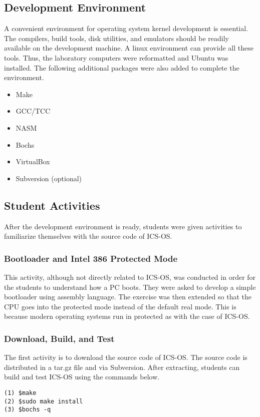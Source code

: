 \documentclass{acm_proc_article-sp}
\begin{document}
\subsection{Development Environment}
A convenient environment for operating system kernel development is essential.
The compilers, build tools, disk utilities, and emulators should be readily 
available on the development machine. A linux environment can provide all these
tools. Thus, the laboratory computers were reformatted and Ubuntu was installed.
The following additional packages were also added to complete the environment.
\begin{itemize}
 \item Make
 \item GCC/TCC
 \item NASM
 \item Bochs
 \item VirtualBox
 \item Subversion (optional)
\end{itemize}

\subsection{Student Activities}
After the development environment is ready, students were given activities
to familiarize themselves with the source code of ICS-OS.

\subsubsection{Bootloader and Intel 386 Protected Mode}
This activity, although not directly related to ICS-OS, was conducted in order
for the students to understand how a PC boots. They were asked to develop a
simple bootloader using assembly language. The exercise was then extended so
that the CPU goes into the protected mode instead of the default real mode.
This is because modern operating systems run in protected as with the case
of ICS-OS.

\subsubsection{Download, Build, and Test}
The first activity is to download the source code of ICS-OS\cite{icsos:site}.
The source code is distributed in a tar.gz file and via Subversion. 
After extracting, students can  build and test ICS-OS using the commands below.
\begin{verbatim}
(1) $make
(2) $sudo make install
(3) $bochs -q
\end{verbatim}
\end{document}

